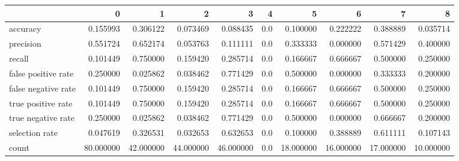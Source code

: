 \begin{tabular}{lrrrrrrrrr}
\toprule
{} &          0 &          1 &          2 &          3 &    4 &          5 &          6 &          7 &          8 \\
\midrule
accuracy            &   0.155993 &   0.306122 &   0.073469 &   0.088435 &  0.0 &   0.100000 &   0.222222 &   0.388889 &   0.035714 \\
precision           &   0.551724 &   0.652174 &   0.053763 &   0.111111 &  0.0 &   0.333333 &   0.000000 &   0.571429 &   0.400000 \\
recall              &   0.101449 &   0.750000 &   0.159420 &   0.285714 &  0.0 &   0.166667 &   0.666667 &   0.500000 &   0.250000 \\
false positive rate &   0.250000 &   0.025862 &   0.038462 &   0.771429 &  0.0 &   0.500000 &   0.000000 &   0.333333 &   0.200000 \\
false negative rate &   0.101449 &   0.750000 &   0.159420 &   0.285714 &  0.0 &   0.166667 &   0.666667 &   0.500000 &   0.250000 \\
true positive rate  &   0.101449 &   0.750000 &   0.159420 &   0.285714 &  0.0 &   0.166667 &   0.666667 &   0.500000 &   0.250000 \\
true negative rate  &   0.250000 &   0.025862 &   0.038462 &   0.771429 &  0.0 &   0.500000 &   0.000000 &   0.666667 &   0.200000 \\
selection rate      &   0.047619 &   0.326531 &   0.032653 &   0.632653 &  0.0 &   0.100000 &   0.388889 &   0.611111 &   0.107143 \\
count               &  80.000000 &  42.000000 &  44.000000 &  46.000000 &  0.0 &  18.000000 &  16.000000 &  17.000000 &  10.000000 \\
\bottomrule
\end{tabular}
